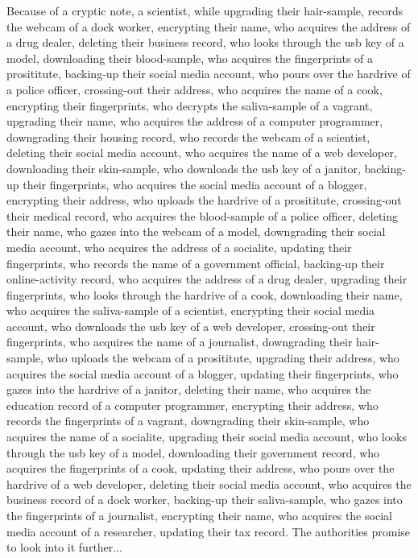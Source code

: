 \documentclass{report}
\begin{document}
Because of a cryptic note, a scientist, while upgrading their hair-sample, records the webcam of a dock worker, encrypting their name, who acquires the address of a drug dealer, deleting their business record, who looks through the usb key of a model, downloading their blood-sample, who acquires the fingerprints of a prosititute, backing-up their social media account, who pours over the hardrive of a police officer, crossing-out their address, who acquires the name of a cook, encrypting their fingerprints, who decrypts the saliva-sample of a vagrant, upgrading their name, who acquires the address of a computer programmer, downgrading their housing record, who records the webcam of a scientist, deleting their social media account, who acquires the name of a web developer, downloading their skin-sample, who downloads the usb key of a janitor, backing-up their fingerprints, who acquires the social media account of a blogger, encrypting their address, who uploads the hardrive of a prosititute, crossing-out their medical record, who acquires the blood-sample of a police officer, deleting their name, who gazes into the webcam of a model, downgrading their social media account, who acquires the address of a socialite, updating their fingerprints, who records the name of a government official, backing-up their online-activity record, who acquires the address of a drug dealer, upgrading their fingerprints, who looks through the hardrive of a cook, downloading their name, who acquires the saliva-sample of a scientist, encrypting their social media account, who downloads the usb key of a web developer, crossing-out their fingerprints, who acquires the name of a journalist, downgrading their hair-sample, who uploads the webcam of a prosititute, upgrading their address, who acquires the social media account of a blogger, updating their fingerprints, who gazes into the hardrive of a janitor, deleting their name, who acquires the education record of a computer programmer, encrypting their address, who records the fingerprints of a vagrant, downgrading their skin-sample, who acquires the name of a socialite, upgrading their social media account, who looks through the usb key of a model, downloading their government record, who acquires the fingerprints of a cook, updating their address, who pours over the hardrive of a web developer, deleting their social media account, who acquires the business record of a dock worker, backing-up their saliva-sample, who gazes into the fingerprints of a journalist, encrypting their name, who acquires the social media account of a researcher, updating their tax record. The authorities promise to look into it further...
\end{document}
